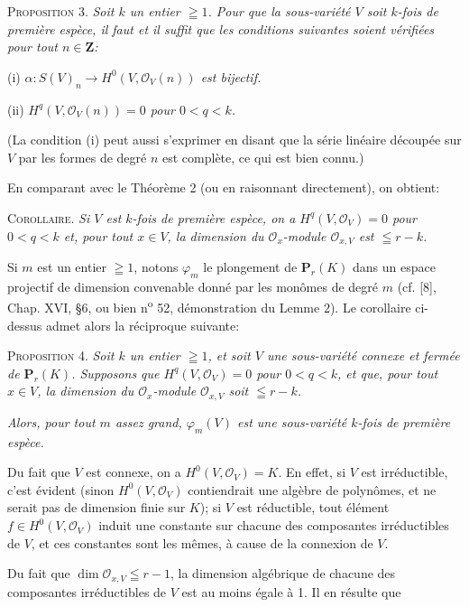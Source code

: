 
\textsc{Proposition} 3. \textit{Soit $k$ un entier $\geqq 1$. Pour que la sous-variété $V$ soit $k$-fois de première espèce, il faut et il suffit que les conditions suivantes soient vérifiées pour tout $n \in \mathbf{Z}$:}

(i) \textit{$\alpha : S(V)_n \to H^0(V, \mathcal{O}_V(n))$ est bijectif.}

(ii) \textit{$H^q(V, \mathcal{O}_V(n)) = 0$ pour $0 < q < k$.}

(La condition (i) peut aussi s'exprimer en disant que la série linéaire découpée sur $V$ par les formes de degré $n$ est complète, ce qui est bien connu.)

En comparant avec le Théorème 2 (ou en raisonnant directement), on obtient:

\textsc{Corollaire}. \textit{Si $V$ est $k$-fois de première espèce, on a $H^q(V, \mathcal{O}_V) = 0$ pour $0 < q < k$ et, pour tout $x \in V$, la dimension du $\mathcal{O}_x$-module $\mathcal{O}_{x,V}$ est $\leqq r - k$.}

Si $m$ est un entier $\geqq 1$, notons $\varphi_m$ le plongement de $\mathbf{P}_r(K)$ dans un espace projectif de dimension convenable donné par les monômes de degré $m$ (cf. [8], Chap. XVI, \S6, ou bien n\textsuperscript{o} 52, démonstration du Lemme 2). Le corollaire ci-dessus admet alors la réciproque suivante:

\textsc{Proposition} 4. \textit{Soit $k$ un entier $\geqq 1$, et soit $V$ une sous-variété connexe et fermée de $\mathbf{P}_r(K)$. Supposons que $H^q(V, \mathcal{O}_V) = 0$ pour $0 < q < k$, et que, pour tout $x \in V$, la dimension du $\mathcal{O}_x$-module $\mathcal{O}_{x,V}$ soit $\leqq r - k$.}

\textit{Alors, pour tout $m$ assez grand, $\varphi_m(V)$ est une sous-variété $k$-fois de première espèce.}

Du fait que $V$ est connexe, on a $H^0(V, \mathcal{O}_V) = K$. En effet, si $V$ est irréductible, c'est évident (sinon $H^0(V, \mathcal{O}_V)$ contiendrait une algèbre de polynômes, et ne serait pas de dimension finie sur $K$); si $V$ est réductible, tout élément $f \in H^0(V, \mathcal{O}_V)$ induit une constante sur chacune des composantes irréductibles de $V$, et ces constantes sont les mêmes, à cause de la connexion de $V$.

Du fait que $\dim \mathcal{O}_{x,V} \leqq r - 1$, la dimension algébrique de chacune des composantes irréductibles de $V$ est au moins égale à 1. Il en résulte que


